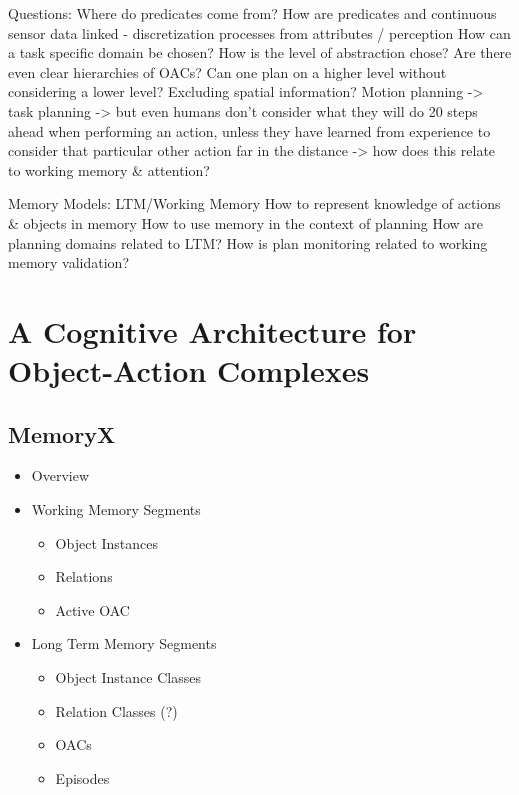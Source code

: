 \documentclass[english,ngerman]{KITreprt}
\begin{document}
Questions:
Where do predicates come from?
How are predicates and continuous sensor data linked
  - discretization processes from attributes / perception
How can a task specific domain be chosen?
How is the level of abstraction chose?
Are there even clear hierarchies of OACs?
Can one plan on a higher level without considering a lower level?
Excluding spatial information? Motion planning -> task planning
-> but even humans don't consider what they will do 20 steps ahead when performing an action, unless they have learned from experience to consider that particular other action far in the distance -> how does this relate to working memory \& attention?

Memory Models: LTM/Working Memory
How to represent knowledge of actions \& objects in memory
How to use memory in the context of planning
How are planning domains related to LTM?
How is plan monitoring related to working memory validation?

\chapter{A Cognitive Architecture for Object-Action Complexes}

\section{MemoryX}
\begin{itemize}
    \item Overview
    \item Working Memory Segments
        \begin{itemize}
            \item Object Instances
            \item Relations
            \item Active OAC
        \end{itemize}
    \item Long Term Memory Segments
        \begin{itemize}
            \item Object Instance Classes
            \item Relation Classes (?)
            \item OACs
            \item Episodes
        \end{itemize}
\end{itemize}
\end{document}
